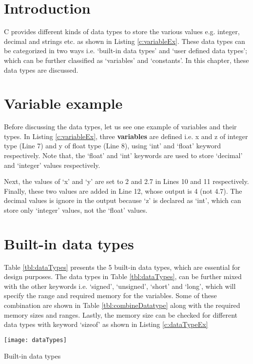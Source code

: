 \section{Introduction}
C provides different kinds of data types to store the various values e.g. integer, decimal and strings etc. as shown in Listing \ref{c:variableEx}. These data types can be categorized in two ways i.e. `built-in data types' and `user defined data types'; which can be further classified as `variables' and `constants'. In this chapter, these data types are discussed.

\section{Variable example}
Before discussing the data types, let us see one example of variables and their types. In Listing \ref{c:variableEx}, three \textbf{variables} are defined i.e. x and z of integer type (Line 7) and y of float type (Line 8), using `int' and `float' keyword respectively. Note that, the `float' and `int' keywords are used to store `decimal' and `integer' values respectively.



Next, the values of `x' and `y' are set to 2 and 2.7 in Lines 10 and 11 respectively. Finally, these two values are added in Line 12, whose output is 4 (not 4.7). The decimal values is ignore in the output because `z' is declared as `int', which can store only `integer' values, not the `float' values. 


\section{Built-in data types}
Table \ref{tbl:dataTypes} presents the 5 built-in data types, which are essential for design purposes. The data types in Table \ref{tbl:dataTypes},  can be further mixed with the other keywords i.e. `signed', `unsigned', `short' and `long', which will specify the range and required memory for the variables. Some of these combination are shown in Table \ref{tbl:combineDatatype} along with the required memory sizes and ranges. Lastly, the memory size can be checked for different data types with keyword `sizeof' as shown in Listing \ref{c:dataTypeEx}

\begin{table}[!h]
	\centering
	\texttt{[image: dataTypes]}
	\caption{Built-in data types}
	\label{tbl:dataTypes}
\end{table}

